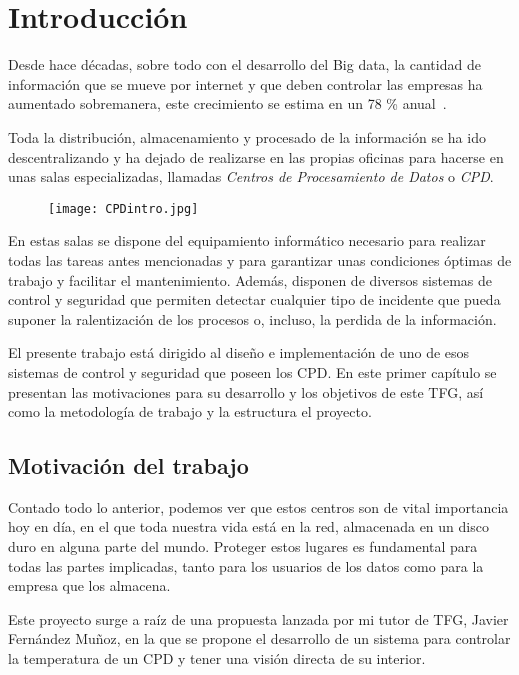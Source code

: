 \chapter{Introducción}
\label{ch:introduccion}
Desde hace décadas, sobre todo con el desarrollo del Big data, la cantidad de información que se mueve por internet y que deben controlar las empresas ha aumentado sobremanera, este crecimiento se estima en un 78 \% anual~\cite{monleon-getino_impacto_2015}.

Toda la distribución, almacenamiento y procesado de la información se ha ido descentralizando y ha dejado de realizarse en las propias oficinas para hacerse en unas salas especializadas, llamadas \textit{Centros de Procesamiento de Datos} o \textit{CPD}.
\begin{figure}[H]
	{\texttt{[image: CPDintro.jpg]}}\label{fig:ejemploCPD}
\end{figure}
En estas salas se dispone del equipamiento informático necesario para realizar todas las tareas antes mencionadas y para garantizar unas condiciones óptimas de trabajo y facilitar el mantenimiento. Además, disponen de diversos sistemas de control y seguridad que permiten detectar cualquier tipo de incidente que pueda suponer la ralentización de los procesos o, incluso, la perdida de la información.

El presente trabajo está dirigido al diseño e implementación de uno de esos sistemas de control y seguridad que poseen los CPD. En este primer capítulo se presentan las motivaciones para su desarrollo y los objetivos de este TFG, así como la metodología de trabajo y la estructura el proyecto.

\section{Motivación del trabajo}\label{sec:motivación-del-trabajo}
Contado todo lo anterior, podemos ver que estos centros son de vital importancia hoy en día, en el que toda nuestra vida está en la red, almacenada en un disco duro en alguna parte del mundo. Proteger estos lugares es fundamental para todas las partes implicadas, tanto para los usuarios de los datos como para la empresa que los almacena.

Este proyecto surge a raíz de una propuesta lanzada por mi tutor de TFG, Javier Fernández Muñoz, en la que se propone el desarrollo de un sistema para controlar la temperatura de un CPD y tener una visión directa de su interior. 

